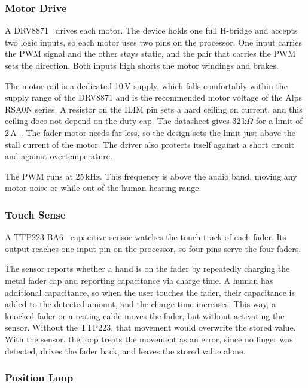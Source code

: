 \documentclass[11pt, letterpaper,titlepage]{article}
\begin{document}
\subsubsection*{Motor Drive}
\label{sssec:fader-motor}

A DRV8871~\cite{drv8871} drives each motor. The device holds one full H-bridge and accepts two
logic inputs, so each motor uses two pins on the processor. One input carries
the PWM signal and the other stays static, and the pair that carries the PWM
sets the direction. Both inputs high shorts the motor windings and brakes.

The motor rail is a dedicated 10\,V supply, which falls comfortably within the supply range of the DRV8871 and is the recommended motor voltage of the Alps RSA0N series. A resistor on the ILIM pin sets a hard ceiling on current, and this ceiling does
not depend on the duty cap. The datasheet gives 32\,k$\Omega$ for a limit of
2\,A~\cite{drv8871}. The fader motor needs far less, so the design sets the limit just above
the stall current of the motor. The driver also protects itself against a short
circuit and against overtemperature.

The PWM runs at 25\,kHz. This frequency is above the audio band, moving any motor noise or while out of the human hearing range. 

\subsubsection*{Touch Sense}
\label{sssec:fader-touch}

A TTP223-BA6~\cite{ttp223} capacitive sensor watches the touch track of each fader. Its output
reaches one input pin on the processor, so four pins serve the four faders.

The sensor reports whether a hand is on the fader by repeatedly charging the metal fader cap and reporting capacitance via charge time. A human has additional capacitance, so when the user touches the fader, their capacitance is added to the detected amount, and the charge time increases. This way, a
knocked fader or a resting cable moves the fader, but without activating the sensor. Without the TTP223, that movement would overwrite the stored value. With
the sensor, the loop treats the movement as an error, since no finger was detected, drives the fader back, and
leaves the stored value alone.

\subsubsection*{Position Loop}
\label{sssec:fader-loop}
\end{document}
